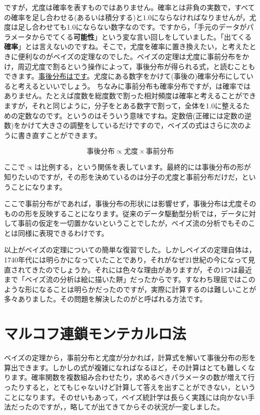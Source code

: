 \documentclass{ltjsbook}
\begin{document}
ですが，尤度は確率を表すものではありません。確率とは非負の実数で，すべての確率を足し合わせる(あるいは積分する)と$1.0$にならなければなりませんが，尤度は足し合わせても1.0にならない数字なのです。ですから，「手元のデータがパラメータからでてくる\textbf{可能性}」という変な言い回しをしていました。「出てくる\textbf{確率}」とは言えないのですね。そこで，尤度を確率に置き換えたい，と考えたときに便利なのがベイズの定理なのでした。ベイズの定理は尤度に事前分布をかけ，周辺尤度で割るという操作によって，事後分布が得られる式，と読むこともできます。\underline{事後分布はです}。尤度にある数字をかけて(事後の)確率分布にしていると考えるといいでしょう。
ちなみに事前分布も確率分布ですが，は確率ではありません。たとえば度数を総度数で割った相対頻度は確率と考えることができますが，それと同じように，分子をとある数字で割って，全体を1.0に整えるための定数なのです。というのはそういう意味ですね。定数倍(正確には定数の逆数)をかけて大きさの調整をしているだけですので，ベイズの式はさらに次のように書き直すことができます。

$$ \mbox{事後分布} \propto \mbox{尤度}\times \mbox{事前分布} $$

ここで$\propto$は比例する，という関係を表しています。最終的には事後分布の形が知りたいのですが，その形を決めているのは分子の尤度と事前分布だけだ，ということになります。

ここで事前分布がであれば，事後分布の形状には影響せず，事後分布は尤度そのものの形を反映することになります。従来のデータ駆動型分析では，データに対して事前の仮定を一切置かないということでしたが，ベイズ流の分析でもそのことは同様に表現できるわけです。

以上がベイズの定理についての簡単な復習でした。しかしベイズの定理自体は，1740年代には明らかになっていたことであり，それがなぜ21世紀の今になって見直されてきたのでしょうか。それには色々な理由がありますが，その1つは最近まで「ベイズ流の分析は絵に描いた餅」だったからです。すなわち理屈ではこのような形になることは明らかだったのですが，実際に計算するのは難しいことが多々ありました。その問題を解決したのがと呼ばれる方法です。

\section{マルコフ連鎖モンテカルロ法}
\label{MCMC}
ベイズの定理から，事前分布と尤度が分かれば，計算式を解いて事後分布の形を算出できます。しかしの式が複雑になればなるほど，その計算はとても難しくなります。確率関数を複数組み合わせたり，求めるべきパラメータの数が増えて行ったりすると，とてもじゃないけど計算して答えを出すことができない，ということになります。そのせいもあって，ベイズ統計学は長らく実践には向かない手法だったのですが，，略してが出てきてからその状況が一変しました。
\end{document}
